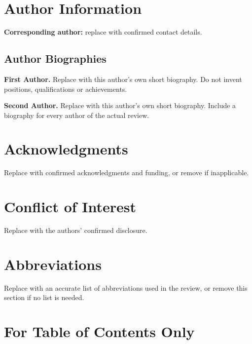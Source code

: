 \documentclass[letterpaper,11pt]{article}
\begin{document}
\section*{Author Information}
\noindent\textbf{Corresponding author:} replace with confirmed contact details.

\subsection*{Author Biographies}
\noindent\textbf{First Author.} Replace with this author's own short biography.
Do not invent positions, qualifications or achievements.

\medskip\noindent\textbf{Second Author.} Replace with this author's own short
biography. Include a biography for every author of the actual review.

\section*{Acknowledgments}
Replace with confirmed acknowledgments and funding, or remove if inapplicable.
\section*{Conflict of Interest}
Replace with the authors' confirmed disclosure.
\section*{Abbreviations}
Replace with an accurate list of abbreviations used in the review, or remove
this section if no list is needed.



\clearpage
\section*{For Table of Contents Only}
\begin{center}
\end{center}
\end{document}
